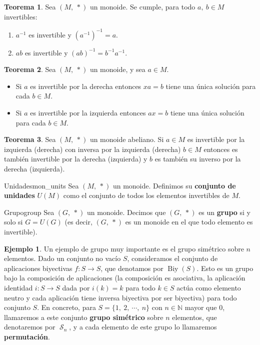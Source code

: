 \documentclass[a4paper]{book}
\theoremstyle{definition}
\newtheorem{theorem}{Teorema}[section]
\theoremstyle{ejemplo}
\newtheorem{ejem}{Ejemplo}[section]
\theoremstyle{demostracion}
\newcommand{\naturales}{\mathbb{N}}
\DeclareMathOperator{\biy}{Biy}
\DeclareMathOperator{\simgroup}{\mathcal{S}}
\begin{document}
\begin{theorem}
	Sea $(M,\ *)$ un monoide. Se cumple, para todo $a,\ b \in M$ invertibles:
	\begin{enumerate}
		\item
		$a^{-1}$ es invertible y $(a^{-1})^{-1} = a$. 
		
		\item
		$ab$ es invertible y $(ab)^{-1} = b^{-1} a^{-1}$.
	\end{enumerate}
\end{theorem}

\begin{theorem}
	Sea $(M,\ *)$ un monoide, y sea $a \in M$.
	\begin{itemize}
		\item
		Si $a$ es invertible por la derecha entonces $xa = b$ tiene una única solución para cada $b \in M$.
		
		\item
		Si $a$ es invertible por la izquierda entonces $ax = b$ tiene una única solución para cada $b \in M$.
	\end{itemize}
\end{theorem}

\begin{theorem}
	Sea $(M,\ *)$ un monoide abeliano. Si $a \in M$ es invertible por la izquierda (derecha) con inversa por la izquierda (derecha) $b \in M$ entonces es también invertible por la derecha (izquierda) y $b$ es también su inverso por la derecha (izquierda).
\end{theorem}

\begin{define}{Unidades}{mon_units}
	Sea $(M,\ *)$ un monoide. Definimos su \textbf{conjunto de unidades} $U(M)$ como el conjunto de todos los elementos invertibles de $M$.
\end{define}

\begin{define}{Grupo}{group}
	Sea $(G,\ *)$ un monoide. Decimos que $(G,\ *)$ es un \textbf{grupo} si y solo si $G = U(G)$ (es decir, $(G,\ *)$ es un monoide en el que todo elemento es invertible).
\end{define}

\begin{ejem}\label{ej:group_biy}
	Un ejemplo de grupo muy importante es el grupo simétrico sobre $n$ elementos. Dado un conjunto no vacío $S$, consideramos el conjunto de aplicaciones biyectivas $f: S \rightarrow S$, que denotamos por $\biy(S)$. Esto es un grupo bajo la composición de aplicaciones (la composición es asociativa, la aplicación identidad $i: S \rightarrow S$ dada por $i(k) = k$ para todo $k \in S$ actúa como elemento neutro y cada aplicación tiene inversa biyectiva por ser biyectiva) para todo conjunto $S$. En concreto, para $S = \{1,\ 2,\ \cdots,\ n\}$ con $n \in \naturales$ mayor que $0$, llamaremos a este conjunto \textbf{grupo simétrico} sobre $n$ elementos, que denotaremos por $\simgroup_n$, y a cada elemento de este grupo lo llamaremos \textbf{permutación}.
\end{ejem}
\end{document}
